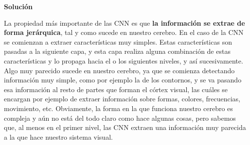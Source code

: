 \documentclass[11pt,a4paper]{article}
\newcommand{\answer}{\noindent\textbf{Solución}}
\begin{document}
\answer

La propiedad más importante de las CNN es que \textbf{la información se extrae de forma
jerárquica}, tal y como sucede en nuestro cerebro. En el caso de la CNN se
comienzan a extraer características muy simples. Estas características son
pasadas a la siguiente capa, y esta capa realiza alguna combinación de estas características
y lo propaga hacia el o los siguientes niveles, y así sucesivamente. Algo muy parecido
sucede en nuestro cerebro, ya que se comienza detectando información muy simple, como por ejemplo
la de los contornos, y se va pasando esa información al resto de partes
que forman el córtex visual, las cuáles se encargan por ejemplo de extraer
información sobre formas, colores, frecuencias, movimiento, etc. Obviamente,
la forma en la que funciona nuestro cerebro es compleja y aún no está
del todo claro como hace algunas cosas, pero sabemos que, al menos en el
primer nivel, las CNN extraen una información muy parecida a la
que hace nuestro sistema visual.

\newpage


\nocite{*}

\end{document}
